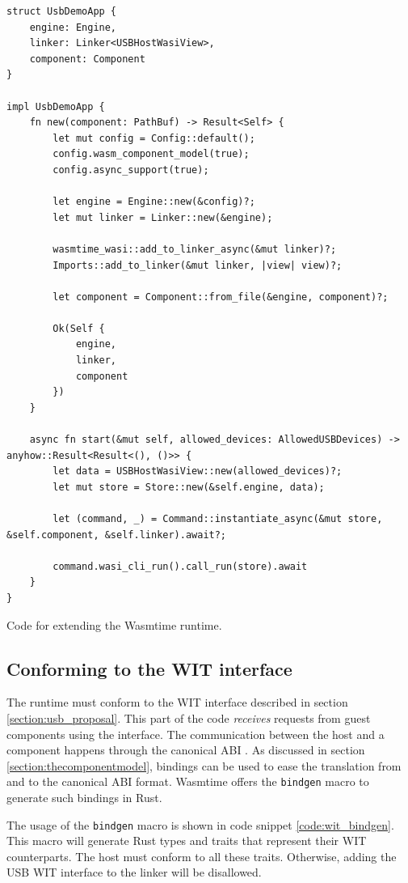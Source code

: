 \begin{code}
\begin{verbatim}
struct UsbDemoApp {
	engine: Engine,
	linker: Linker<USBHostWasiView>,
	component: Component
}

impl UsbDemoApp {
	fn new(component: PathBuf) -> Result<Self> {
		let mut config = Config::default();
		config.wasm_component_model(true);
		config.async_support(true);

		let engine = Engine::new(&config)?;
		let mut linker = Linker::new(&engine);

		wasmtime_wasi::add_to_linker_async(&mut linker)?;
		Imports::add_to_linker(&mut linker, |view| view)?;
		
		let component = Component::from_file(&engine, component)?;

		Ok(Self {
			engine,
			linker,
			component
		})
	}

	async fn start(&mut self, allowed_devices: AllowedUSBDevices) -> anyhow::Result<Result<(), ()>> {
		let data = USBHostWasiView::new(allowed_devices)?;
		let mut store = Store::new(&self.engine, data);
	
		let (command, _) = Command::instantiate_async(&mut store, &self.component, &self.linker).await?;
	
		command.wasi_cli_run().call_run(store).await
	}
}
\end{verbatim} 
\caption{Code for extending the Wasmtime runtime.}
\label{code:start_component}
\end{code}

\subsection{Conforming to the \acrshort{WIT} interface}
The runtime must conform to the \acrshort{WIT} interface described in section \ref{section:usb_proposal}. This part of the code \textit{receives} requests from guest components using the interface. The communication between the host and a component happens through the canonical ABI \cite{canonical_abi}. As discussed in section \ref{section:thecomponentmodel}, bindings can be used to ease the translation from and to the canonical ABI format. Wasmtime offers the \texttt{bindgen} macro \cite{wasmtime_component_bindgen} to generate such bindings in Rust.

The usage of the \texttt{bindgen} macro is shown in code snippet \ref{code:wit_bindgen}.
This macro will generate Rust types and traits that represent their \acrshort{WIT} counterparts. The host must conform to all these traits. Otherwise, adding the \acrshort{USB} \acrshort{WIT} interface to the linker will be disallowed.

